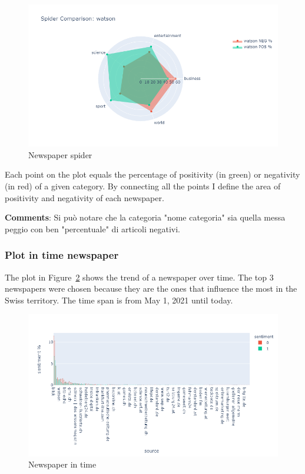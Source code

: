 \begin{figure}[H]
\centering
\includegraphics[width=1\textwidth]{images/output_110_9.png}
\caption{Newspaper spider}
\label{fig:fig_spider}
\end{figure}
\FloatBarrier
Each point on the plot equals the percentage of positivity (in green) or negativity (in red) of a given category. By connecting all the points I define the area of positivity and negativity of each newspaper.

\textbf{Comments}: Si può notare che la categoria "nome categoria" sia quella messa peggio con ben "percentuale" di articoli negativi.


\subsubsection{Plot in time newspaper} 
The plot in Figure~\ref{fig:fig_timenews} shows the trend of a newspaper over time.
The top 3 newspapers were chosen because they are the ones that influence the most in the Swiss territory.
The time span is from May 1, 2021 until today.

\begin{figure}[H]
\centering
\includegraphics[width=1\textwidth]{images/output_71_0.png}
\caption{Newspaper in time}
\label{fig:fig_timenews}
\end{figure}
\FloatBarrier


